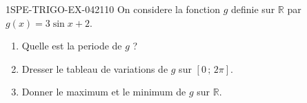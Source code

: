 \begin{exercice}{1SPE-TRIGO-EX-042}{1}{10}
On considere la fonction $g$ definie sur $\mathbb{R}$ par $g(x) = 3\sin x + 2$.
\begin{enumerate}
  \item Quelle est la periode de $g$ ?
  \item Dresser le tableau de variations de $g$ sur $[0\,;\,2\pi]$.
  \item Donner le maximum et le minimum de $g$ sur $\mathbb{R}$.
\end{enumerate}
\end{exercice}

